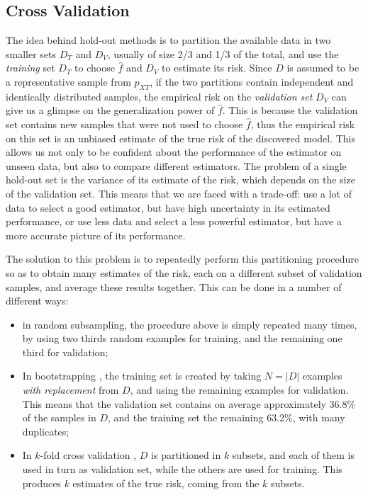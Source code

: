 \documentclass[a4paper]{book}
\begin{document}
\subsection{Cross Validation}
\label{sec:cv}
The idea behind hold-out methods is to partition the available data in two smaller sets $D_T$ and $D_V$, usually of size 2/3 and 1/3 of the total, and use the \emph{training} set $D_T$ to choose $\hat{f}$ and $D_V$ to estimate its risk. Since $D$ is assumed to be a representative sample from $p_{XT}$, if the two partitions contain independent and identically distributed samples, the empirical risk on the \emph{validation set} $D_V$ can give us a glimpse on the generalization power of $\hat{f}$. This is because the validation set contains new samples that were not used to choose $\hat{f}$, thus the empirical risk on this set is an unbiased estimate of the true risk of the discovered model. This allows us not only to be confident about the performance of the estimator on unseen data, but also to compare different estimators. The problem of a single hold-out set is the variance of its estimate of the risk, which depends on the size of the validation set. This means that we are faced with a trade-off: use a lot of data to select a good estimator, but have high uncertainty in its estimated performance, or use less data and select a less powerful estimator, but have a more accurate picture of its performance.

The solution to this problem is to repeatedly perform this partitioning procedure so as to obtain many estimates of the risk, each on a different subset of validation samples, and average these results together. This can be done in a number of different ways:

\begin{itemize}
\item in random subsampling, the procedure above is simply repeated many times, by using two thirds random examples for training, and the remaining one third for validation;
\item In bootstrapping \citep{bootstrap}, the training set is created by taking $N=\vert D\vert$ examples \emph{with replacement} from $D$, and using the remaining examples for validation. This means that the validation set contains on average approximately 36.8\% of the samples in $D$, and the training set the remaining 63.2\%, with many duplicates;
\item In $k$-fold cross validation \citep{kfold}, $D$ is partitioned in $k$ subsets, and each of them is used in turn as validation set, while the others are used for training. This produces $k$ estimates of the true risk, coming from the $k$ subsets.
\end{itemize}
\end{document}
